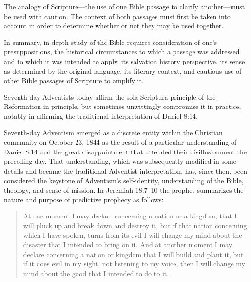 The analogy of Scripture---the use of one Bible passage to clarify
another---must be used with caution. 
The context of both passages must 
first be taken into account in order to determine whether or not they may be
used together.

In summary, in-depth study of the Bible requires consideration of one's
presuppositions, the historical circumstances to which a passage was
addressed and to which it was intended to apply, its salvation history
perspective, its sense as determined by the original language, its literary
context, and cautious use of other Bible passages of Scripture to amplify
it.

Seventh-day Adventists today affirm the sola Scriptura principle of the
Reformation in principle, but sometimes unwittingly compromise it in
practice, notably in affirming the traditional interpretation of Daniel
8:14.

Seventh-day Adventism emerged as a discrete entity within the Christian
community on October 23, 1844 as the result of a particular understanding
of Daniel 8:14 and the great disappointment that attended their
disillusionment the preceding day. That understanding, which was
subsequently modified in some details and became the traditional Adventist
interpretation, has, since then, been considered the keystone of Adventism's
self-identity, understanding of the Bible, theology, and sense of mission.
In Jeremiah 18:7--10 the prophet summarizes the nature and purpose of
predictive prophecy as follows: 
\begin{quote}
At one moment I may declare concerning a nation or a
kingdom, that I will pluck up and break down and destroy it, but if that
nation concerning which I have spoken, turns from its evil I will change my
mind about the disaster that I intended to bring on it. And at another
moment I may declare concerning a nation or kingdom that I will build and
plant it, but if it does evil in my sight, not listening to my voice, then I
will change my mind about the good that I intended to do to it. 
\end{quote}

